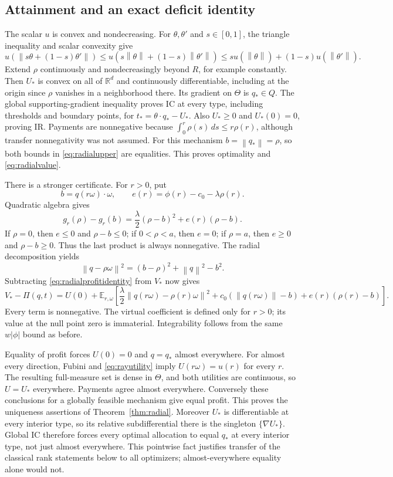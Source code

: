 \documentclass[11pt,a4paper]{article}
\numberwithin{equation}{section}
\newcommand{\R}{\mathbb R}
\newcommand{\E}{\mathbb E}
\newcommand{\norm}[1]{\left\lVert #1\right\rVert}
\begin{document}
\subsection{Attainment and an exact deficit identity}
The scalar \(u\) is convex and nondecreasing.
For \(\theta,\theta'\) and \(s\in[0,1]\), the triangle inequality and
scalar convexity give
\[
 u(\norm{s\theta+(1-s)\theta'})
 \le u(s\norm\theta+(1-s)\norm{\theta'})
 \le su(\norm\theta)+(1-s)u(\norm{\theta'}).
\]
Extend \(\rho\) continuously and nondecreasingly beyond \(R\), for
example constantly. Then \(U_*\) is convex on all of \(\R^d\) and
continuously differentiable, including at the origin since \(\rho\)
vanishes in a neighborhood there.
Its gradient on \(\Theta\) is \(q_*\in Q\).
The global supporting-gradient inequality proves IC at every type,
including thresholds and boundary points, for
\(t_*=\theta\cdot q_*-U_*\).
Also \(U_*\ge0\) and \(U_*(0)=0\), proving IR.
Payments are nonnegative because
\(\int_0^r\rho(s)\,ds\le r\rho(r)\), although transfer nonnegativity
was not assumed. For this mechanism \(b=\norm{q_*}=\rho\), so both
bounds in \eqref{eq:radialupper} are equalities.
This proves optimality and \eqref{eq:radialvalue}.

There is a stronger certificate. For \(r>0\), put
\[
 b=q(r\omega)\cdot\omega,\qquad
 e(r)=\phi(r)-c_0-\lambda\rho(r).
\]
Quadratic algebra gives
\[
 g_r(\rho)-g_r(b)
 =\frac{\lambda}{2}(\rho-b)^2+e(r)(\rho-b).
\]
If \(\rho=0\), then \(e\le0\) and \(\rho-b\le0\);
if \(0<\rho<a\), then \(e=0\);
if \(\rho=a\), then \(e\ge0\) and \(\rho-b\ge0\).
Thus the last product is always nonnegative.
The radial decomposition yields
\[
 \norm{q-\rho\omega}^2=(b-\rho)^2+\norm q^2-b^2.
\]
Subtracting \eqref{eq:radialprofitidentity} from \(V_*\) now gives
\begin{equation}\label{eq:deficit}
 V_*-\Pi(q,t)=U(0)+
 \E_{r,\omega}\left[
   \frac{\lambda}{2}\norm{q(r\omega)-\rho(r)\omega}^2
   +c_0(\norm{q(r\omega)}-b)+e(r)(\rho(r)-b)\right].
\end{equation}
Every term is nonnegative. The virtual coefficient is defined only
for \(r>0\); its value at the null point zero is immaterial.
Integrability follows from the same \(w|\phi|\) bound as before.

Equality of profit forces \(U(0)=0\) and \(q=q_*\) almost everywhere.
For almost every direction, Fubini and \eqref{eq:rayutility} imply
\(U(r\omega)=u(r)\) for every \(r\).
The resulting full-measure set is dense in \(\Theta\), and both
utilities are continuous, so \(U=U_*\) everywhere.
Payments agree almost everywhere. Conversely these conclusions for
a globally feasible mechanism give equal profit.
This proves the uniqueness assertions of Theorem~\ref{thm:radial}.
Moreover \(U_*\) is differentiable at every interior type, so its
relative subdifferential there is the singleton \(\{\nabla U_*\}\).
Global IC therefore forces every optimal allocation to equal \(q_*\)
at every interior type, not just almost everywhere.
This pointwise fact justifies transfer of the classical rank statements
below to all optimizers; almost-everywhere equality alone would not.
\end{document}
